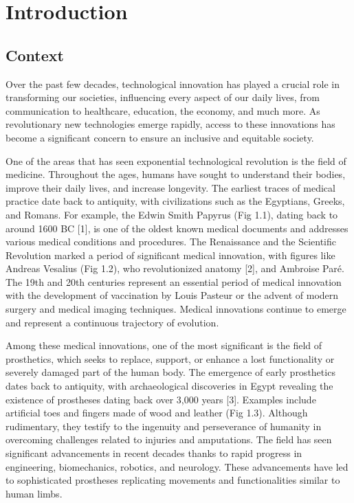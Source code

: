\chapter{Introduction}
\section{Context}
Over the past few decades, technological innovation has played a crucial role in transforming our societies, influencing every aspect of our daily lives, from communication to healthcare, education, the economy, and much more. As revolutionary new technologies emerge rapidly, access to these innovations has become a significant concern to ensure an inclusive and equitable society.

One of the areas that has seen exponential technological revolution is the field of medicine. Throughout the ages, humans have sought to understand their bodies, improve their daily lives, and increase longevity. The earliest traces of medical practice date back to antiquity, with civilizations such as the Egyptians, Greeks, and Romans. For example, the Edwin Smith Papyrus (Fig 1.1), dating back to around 1600 BC [1], is one of the oldest known medical documents and addresses various medical conditions and procedures. The Renaissance and the Scientific Revolution marked a period of significant medical innovation, with figures like Andreas Vesalius (Fig 1.2), who revolutionized anatomy [2], and Ambroise Paré. The 19th and 20th centuries represent an essential period of medical innovation with the development of vaccination by Louis Pasteur or the advent of modern surgery and medical imaging techniques. Medical innovations continue to emerge and represent a continuous trajectory of evolution.

Among these medical innovations, one of the most significant is the field of prosthetics, which seeks to replace, support, or enhance a lost functionality or severely damaged part of the human body. The emergence of early prosthetics dates back to antiquity, with archaeological discoveries in Egypt revealing the existence of prostheses dating back over 3,000 years [3]. Examples include artificial toes and fingers made of wood and leather (Fig 1.3). Although rudimentary, they testify to the ingenuity and perseverance of humanity in overcoming challenges related to injuries and amputations. The field has seen significant advancements in recent decades thanks to rapid progress in engineering, biomechanics, robotics, and neurology. These advancements have led to sophisticated prostheses replicating movements and functionalities similar to human limbs.

